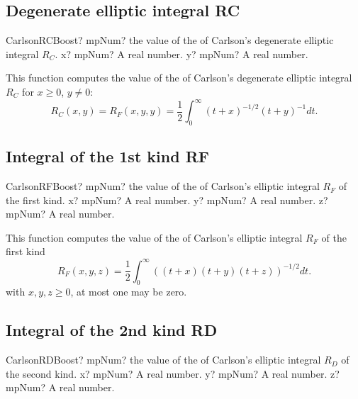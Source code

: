 \subsection{Degenerate elliptic integral RC}

\begin{mpFunctionsExtract}
	\mpFunctionTwo
	{CarlsonRCBoost? mpNum? the value of the of Carlson's degenerate elliptic integral $R_C$.}
	{x? mpNum? A real number.}
	{y? mpNum? A real number.}
\end{mpFunctionsExtract}

\vspace{0.3cm}
This function computes the value of the of Carlson's degenerate elliptic integral $R_C$ for $x \geq 0$, $y \neq 0$:
\begin{equation}
	R_C(x,y)=R_F(x,y,y)=\frac{1}{2} \int_0^\infty (t+x)^{-1/2} (t+y)^{-1} dt.
\end{equation}


\subsection{Integral of the 1st kind RF}

\begin{mpFunctionsExtract}
	\mpFunctionThree
	{CarlsonRFBoost? mpNum? the value of the of Carlson's elliptic integral $R_F$ of the first kind.}
	{x? mpNum? A real number.}
	{y? mpNum? A real number.}
	{z? mpNum? A real number.}
\end{mpFunctionsExtract}

\vspace{0.3cm}
This function computes the value of the of Carlson's elliptic integral $R_F$ of the first kind
\begin{equation}
	R_F(x,y,z)=\frac{1}{2} \int_0^\infty ((t+x)(t+y)(t+z))^{-1/2}  dt.
\end{equation}
with $x, y, z \geq 0$, at most one may be zero. 


\subsection{Integral of the 2nd kind RD}

\begin{mpFunctionsExtract}
	\mpFunctionThree
	{CarlsonRDBoost? mpNum? the value of the of Carlson's elliptic integral $R_D$ of the second kind.}
	{x? mpNum? A real number.}
	{y? mpNum? A real number.}
	{z? mpNum? A real number.}
\end{mpFunctionsExtract}

